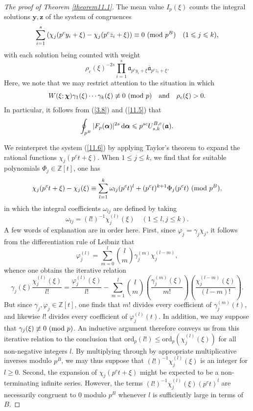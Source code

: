 \documentclass[12pt,reqno]{amsart}
\theoremstyle{definition}
\theoremstyle{remark}
\numberwithin{equation}{section}
\newcommand{\mmod}[1]{\,\,(\text{\rm mod}\,\,#1)}
\def\bfy{{\mathbf y}}
\def\bfz{{\mathbf z}}
\def\dbZ{{\mathbb Z}}\def\dbQ{{\mathbb Q}}
\def\gra{{\mathfrak a}}\def\grA{{\mathfrak A}}\def\bfgra{{\boldsymbol \gra}}
\def\gam{{\gamma}} \def\Gam{{\Gamma}}
\def\bfchi{{\boldsymbol \chi}}
\def\ome{{\omega}} \def\Ome{{\Omega}}
\def\le{\leqslant} \def\ge{\geqslant} \def\pleq{\preccurlyeq} \def\ple{\prec}
\def\d{{\,{\rm d}}}
\begin{document}
\begin{proof}[The proof of Theorem \ref{theorem11.1}]
\par The mean value $I_p(\xi)$ counts the integral solutions $\bfy,\bfz$ of the system of 
congruences
\begin{equation}\label{11.6}
\sum_{i=1}^s\left( \chi_j(p^cy_i+\xi)-\chi_j(p^cz_i+\xi)\right) \equiv 0\mmod{p^B}\quad 
(1\le j\le k),
\end{equation}
with each solution being counted with weight
\begin{equation}\label{11.7}
\rho_c(\xi)^{-2s}\prod_{i=1}^s \gra_{p^cy_i+\xi}{\overline \gra_{p^cz_i+\xi}}.
\end{equation}
Here, we note that we may restrict attention to the situation in which
$$W(\xi;\bfchi)\gam_1(\xi)\cdots \gam_k(\xi)\not\equiv 0\mmod{p} \quad \text{and}\quad 
\rho_c(\xi)>0.$$
In particular, it follows from (\ref{3.8}) and (\ref{11.5}) that
$$\oint_{p^B}|F_p(\bfalp)|^{2s}\d\bfalp \le p^{sc}U_{s,k}^{B,c}(\bfgra).$$

\par We reinterpret the system (\ref{11.6}) by applying Taylor's theorem to expand the 
rational functions $\chi_j(p^ct+\xi)$. When $1\le j\le k$, we find that for suitable 
polynomials $\Phi_j\in \dbZ[t]$, one has
$$\chi_j(p^ct+\xi)-\chi_j(\xi)\equiv \sum_{l=1}^k 
\ome_{lj}(p^ct)^l+(p^ct)^{k+1}\Phi_j(p^ct)\mmod{p^B},$$
in which the integral coefficients $\ome_{lj}$ are defined by taking
$$\ome_{lj}=(l!)^{-1}\chi_j^{(l)}(\xi)\quad (1\le l,j\le k).$$
A few words of explanation are in order here. First, since $\varphi_j=\gam_j\chi_j$, it 
follows from the differentiation rule of Leibniz that
$$\varphi_j^{(l)}=\sum_{m=0}^l\binom{l}{m}\gam_j^{(m)}\chi_j^{(l-m)},$$
whence one obtains the iterative relation
$$\gam_j(\xi)\frac{\chi_j^{(l)}(\xi)}{l!}=\frac{\varphi_j^{(l)}(\xi)}{l!}-\sum_{m=1}^l
\binom{l}{m}\left( \frac{\gam_j^{(m)}(\xi)}{m!}\right) \left( \frac{\chi_j^{(l-m)}(\xi)}
{(l-m)!}\right) .$$
But since $\gam_j,\varphi_j\in \dbZ[t]$, one finds that $m!$ divides every coefficient of 
$\gam_j^{(m)}(t)$, and likewise $l!$ divides every coefficient of $\varphi_j^{(l)}(t)$. In 
addition, we may suppose that $\gam_j(\xi)\not \equiv 0\mmod{p}$. An inductive argument 
therefore conveys us from this iterative relation to the conclusion that 
$\text{ord}_p(l!)\le \text{ord}_p(\chi_j^{(l)}(\xi))$ for all non-negative integers $l$. By 
multiplying through by appropriate multiplicative inverses modulo $p^B$, we may thus 
suppose that $(l!)^{-1}\chi_j^{(l)}(\xi)$ is an integer for $l\ge 0$. Second, the expansion of 
$\chi_j(p^ct+\xi)$ might be expected to be a non-terminating infinite series. However, the 
terms $(l!)^{-1}\chi_j^{(l)}(\xi) (p^ct)^l$ are necessarily congruent to $0$ modulo $p^B$ 
whenever $l$ is sufficiently large in terms of $B$.\par


\end{proof}
\end{document}

